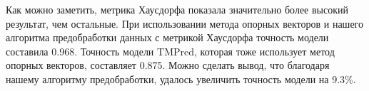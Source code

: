 Как можно заметить, метрика Хаусдорфа показала значительно более высокий результат, чем остальные. При использовании метода опорных векторов и нашего алгоритма предобработки данных с метрикой Хаусдорфа точность модели составила 0.968. Точность модели TMPred, которая тоже использует метод опорных векторов, составляет 0.875. Можно сделать вывод, что благодаря нашему алгоритму предобработки, удалось увеличить точность модели на 9.3\%.
